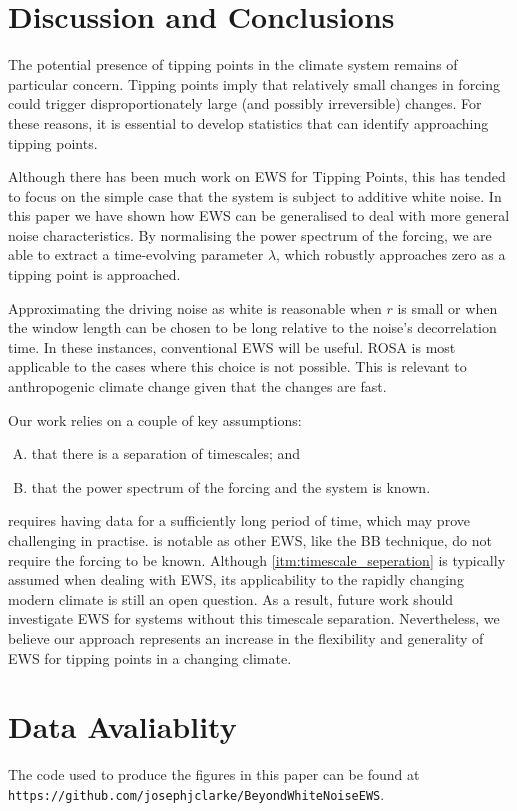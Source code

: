\section{Discussion and Conclusions}
The potential presence of tipping points in the climate system remains of particular concern. 
Tipping points imply that relatively small changes in forcing could trigger
disproportionately large (and possibly irreversible) changes.
For these reasons, it is essential to develop
statistics that can identify approaching tipping points.

Although there has been much work on EWS for Tipping Points,
this has tended to focus on the simple case that the system is subject to additive white noise. 
In this paper we have shown how EWS can be generalised to deal with more general noise characteristics. By normalising the power spectrum of the forcing, we are able to extract a 
time-evolving parameter $\lambda$, which robustly approaches zero as a tipping point is approached.  

Approximating the driving noise as white is reasonable when $r$ is 
small or when the window length can be chosen to be long relative to the 
noise's decorrelation time. In these instances, conventional EWS will be useful. ROSA is most applicable to the cases where this choice is not
possible. This is relevant to anthropogenic climate change given that the changes are fast.

Our work relies on a couple of  key assumptions:
\begin{enumerate}[A.]
\item \label{itm:timescale_seperation} that there is a separation of timescales; and
\item \label{itm:exists} that the power spectrum of the forcing and the system is known.
\end{enumerate}
 requires having data for a sufficiently long period of time, which may 
prove challenging in practise.  is notable as other EWS, like the BB technique, do not require the forcing to be known.
Although \cref{itm:timescale_seperation} is typically assumed when dealing with EWS, its applicability
to the rapidly changing modern climate is still an open question.
As a result, future work should investigate EWS for systems without this timescale separation.
Nevertheless, we believe our approach represents an increase in the flexibility and generality of EWS for tipping points in a changing climate. 

\section*{Data Avaliablity}
The code used to produce the figures in this paper can be found at \texttt{https://github.com/josephjclarke/BeyondWhiteNoiseEWS}.



